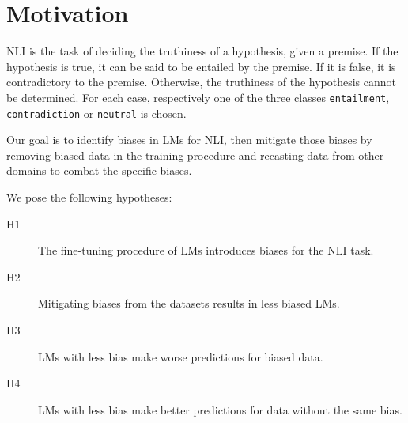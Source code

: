 \section{Motivation}

\ac{NLI} is the task of deciding the truthiness of a hypothesis, given a premise. If the hypothesis is true, it can be said to be entailed by the premise. If it is false, it is contradictory to the premise. Otherwise, the truthiness of the hypothesis cannot be determined. For each case, respectively one of the three classes \texttt{entailment}, \texttt{contradiction} or \texttt{neutral} is chosen.

Our goal is to identify biases in \acp{LM} for \ac{NLI}, then mitigate those biases by removing biased data in the training procedure and recasting data from other domains to combat the specific biases.

We pose the following hypotheses: \vspace*{-0.7em}
\begin{description}
  \item[H1] The fine-tuning procedure of \acp{LM} introduces biases for the \ac{NLI} task.\vspace{-0.7em}
  \item[H2] Mitigating biases from the datasets results in less biased \acp{LM}.\vspace{-0.7em}
  \item[H3] \acp{LM} with less bias make worse predictions for biased data. \vspace{-0.7em}
  \item[H4] \acp{LM} with less bias make better predictions for data without the same bias.
\end{description}